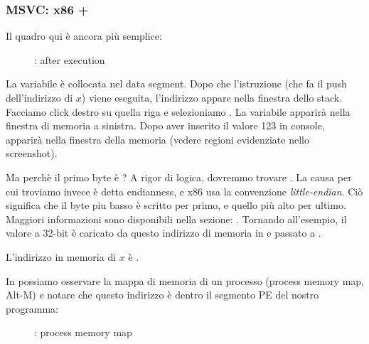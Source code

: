 \clearpage
\subsubsection{MSVC: x86 + \olly}
\myindex{\olly}

Il quadro qui è ancora più semplice:

\begin{figure}[H]
\centering
{}
\caption{\olly: after \scanf execution}
\label{fig:scanf_ex2_olly_1}
\end{figure}

La variabile è collocata nel data segment.
Dopo che l'istruzione \PUSH (che fa il push dell'indirizzo di $x$) viene eseguita, 
l'indirizzo appare nella finestra dello stack. Facciamo click destro su quella riga e selezioniamo .
La variabile apparirà nella finestra di memoria a sinistra.
Dopo aver inserito il valore 123 in console, 
 apparirà nella finestra della memoria (vedere regioni evidenziate nello screenshot).

Ma perchè il primo byte è ?
A rigor di logica, dovremmo trovare .
La causa per cui troviamo invece  è detta \gls{endianness}, e x86 usa la convenzione \emph{little-endian}.
Ciò significa che il byte piu basso è scritto per primo, e quello più alto per ultimo.
Maggiori informazioni sono disponibili nella sezione: .
Tornando all'esempio, il valore a 32-bit è caricato da questo indirizzo di memoria in \EAX e passato a \printf.

L'indirizzo in memoria di $x$ è .

\clearpage
\label{olly_memory_map_example}

In \olly possiamo osservare la mappa di memoria di un processo  (process memory map, Alt-M)
e notare che questo indirizzo è dentro il segmento PE  del nostro programma:

\begin{figure}[H]
\centering
{}
\caption{\olly: process memory map}
\label{fig:scanf_ex2_olly_2}
\end{figure}

